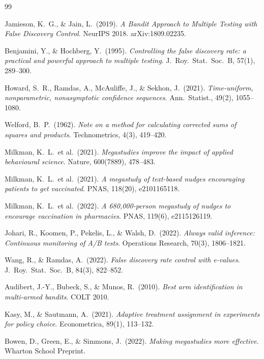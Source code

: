 \documentclass[10.5pt,a4paper]{article}
\begin{document}
\newpage
\begin{thebibliography}{99}

Jamieson, K.~G., \& Jain, L.\ (2019).
\textit{A Bandit Approach to Multiple Testing with False Discovery Control}.
NeurIPS 2018. arXiv:1809.02235.

Benjamini, Y., \& Hochberg, Y.\ (1995).
\textit{Controlling the false discovery rate: a practical and powerful approach
to multiple testing}.
J.\ Roy.\ Stat.\ Soc.\ B, 57(1), 289--300.

Howard, S.~R., Ramdas, A., McAuliffe, J., \& Sekhon, J.\ (2021).
\textit{Time-uniform, nonparametric, nonasymptotic confidence sequences}.
Ann.\ Statist., 49(2), 1055--1080.

Welford, B.~P.\ (1962).
\textit{Note on a method for calculating corrected sums of squares and products}.
Technometrics, 4(3), 419--420.

Milkman, K.~L.\ et al.\ (2021).
\textit{Megastudies improve the impact of applied behavioural science}.
Nature, 600(7889), 478--483.

Milkman, K.~L.\ et al.\ (2021).
\textit{A megastudy of text-based nudges encouraging patients to get vaccinated}.
PNAS, 118(20), e2101165118.

Milkman, K.~L.\ et al.\ (2022).
\textit{A 680,000-person megastudy of nudges to encourage vaccination in pharmacies}.
PNAS, 119(6), e2115126119.

Johari, R., Koomen, P., Pekelis, L., \& Walsh, D.\ (2022).
\textit{Always valid inference: Continuous monitoring of A/B tests}.
Operations Research, 70(3), 1806--1821.

Wang, R., \& Ramdas, A.\ (2022).
\textit{False discovery rate control with e-values}.
J.\ Roy.\ Stat.\ Soc.\ B, 84(3), 822--852.

Audibert, J.-Y., Bubeck, S., \& Munos, R.\ (2010).
\textit{Best arm identification in multi-armed bandits}.
COLT 2010.

Kasy, M., \& Sautmann, A.\ (2021).
\textit{Adaptive treatment assignment in experiments for policy choice}.
Econometrica, 89(1), 113--132.

Bowen, D., Green, E., \& Simmons, J.\ (2022).
\textit{Making megastudies more effective}.
Wharton School Preprint.


\end{thebibliography}
\end{document}
